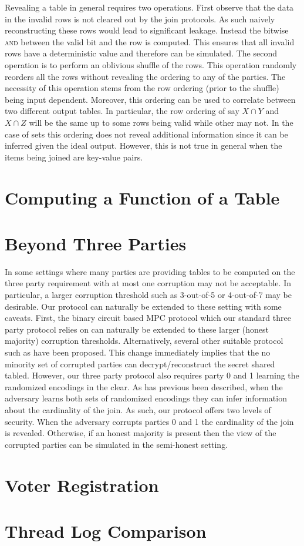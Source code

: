 Revealing a table in general requires two operations. First observe that the data in the invalid rows is not cleared out by the join protocols. As such naively reconstructing these rows would lead to significant leakage. Instead the bitwise \textsc{and} between the valid bit and the row is computed. This ensures that all invalid rows have a deterministic value and therefore can be simulated. The second operation is to perform an oblivious shuffle of the rows. This operation randomly reorders all the rows without revealing the ordering to any of the parties. The necessity of this operation stems from the  row ordering (prior to the shuffle) being input dependent. Moreover, this ordering can be used to correlate between two different output tables. In particular, the row ordering of say $X\cap Y$ and $X\cap Z$ will be the same up to some rows being valid while other may not. In the case of sets this ordering does not reveal additional information since it can be inferred given the ideal output. However, this is not true in general when the items being joined are key-value pairs. 


\section{Computing a Function of a Table}



\section{Beyond Three Parties}

In some settings where many parties are providing tables to be computed on the three party requirement with at most one corruption may not be acceptable. In particular, a larger corruption threshold such as 3-out-of-5 or 4-out-of-7 may be desirable. Our protocol can naturally be extended to these setting with some caveats. First, the binary circuit based MPC protocol\cite{highthroughput} which our standard three party protocol relies on can naturally be extended to these larger (honest majority) corruption thresholds. Alternatively, several other suitable protocol such as\cite{...} have been proposed. This change immediately implies that the no minority set of corrupted parties can decrypt/reconstruct the secret shared tabled. However, our three party protocol also requires party 0 and 1 learning the randomized encodings in the clear.  As has previous been described, when the adversary learns both sets of randomized encodings they can infer information about the cardinality of the join. As such, our protocol offers two levels of security. When the adversary corrupts parties 0 and 1 the cardinality of the join is revealed. Otherwise, if an honest majority is present then the view of the corrupted parties can be simulated in the semi-honest setting. 


\section{Voter Registration}

\section{Thread Log Comparison}



